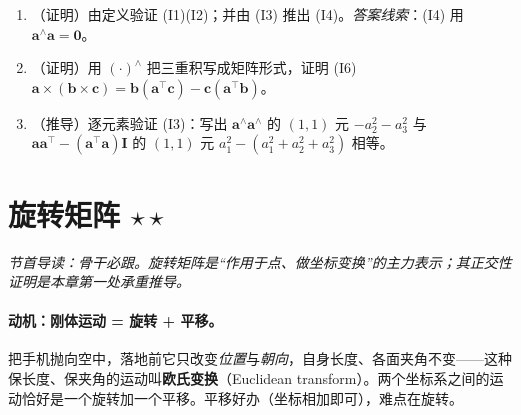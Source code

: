\begin{practice}
\begin{enumerate}
  \item （证明）由定义验证 (I1)(I2)；并由 (I3) 推出 (I4)。\emph{答案线索}：(I4) 用 $\mathbf{a}^\wedge\mathbf{a}=\mathbf{0}$。
  \item （证明）用 $(\cdot)^\wedge$ 把三重积写成矩阵形式，证明 (I6) $\mathbf{a}\times(\mathbf{b}\times\mathbf{c})=\mathbf{b}(\mathbf{a}^\top\mathbf{c})-\mathbf{c}(\mathbf{a}^\top\mathbf{b})$。
  \item （推导）逐元素验证 (I3)：写出 $\mathbf{a}^\wedge\mathbf{a}^\wedge$ 的 $(1,1)$ 元 $-a_2^2-a_3^2$ 与 $\mathbf{a}\mathbf{a}^\top-(\mathbf{a}^\top\mathbf{a})\mathbf{I}$ 的 $(1,1)$ 元 $a_1^2-(a_1^2+a_2^2+a_3^2)$ 相等。
\end{enumerate}
\end{practice}

\section{旋转矩阵 \texorpdfstring{$\star\star$}{**}}
\label{sec:rb-rotation}
\noindent\emph{节首导读：骨干必跟。旋转矩阵是“作用于点、做坐标变换”的主力表示；其正交性证明是本章第一处承重推导。}

\paragraph{动机：刚体运动 = 旋转 + 平移。}
把手机抛向空中，落地前它只改变\emph{位置}与\emph{朝向}，自身长度、各面夹角不变——这种保长度、保夹角的运动叫\textbf{欧氏变换}（Euclidean transform）\cite{gaoxiang2019slam14}。两个坐标系之间的运动恰好是一个旋转加一个平移。平移好办（坐标相加即可），难点在旋转。


